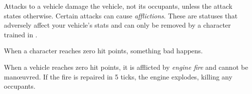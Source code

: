 
Attacks to a vehicle damage the vehicle, not its occupants, unless the attack states otherwise. Certain attacks can cause \emph{afflictions}. These are statuses that adversely affect your vehicle's stats and can only be removed by a character trained in .

When a character reaches zero hit points, something bad happens.

When a vehicle reaches zero hit points, it is afflicted by \emph{engine fire} and cannot be man\oe{}uvred. If the fire is repaired in 5 ticks, the engine explodes, killing any occupants.
